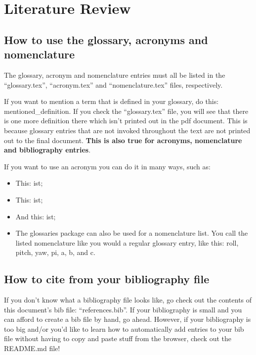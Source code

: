 \chapter{Literature Review}
\label{chapter:literature_review}

\section{How to use the glossary, acronyms and nomenclature}

The glossary, acronym and nomenclature entries must all be listed in the ``glossary.tex'', ``acronym.tex'' and ``nomenclature.tex'' files, respectively. 

If you want to mention a term that is defined in your glossary, do this: \gls{mentioned_definition}. If you check the ``glossary.tex'' file, you will see that there is one more definition there which isn't printed out in the pdf document. This is because glossary entries that are not invoked throughout the text are not printed out to the final document. \textbf{This is also true for acronyms, nomenclature and bibliography entries}.

If you want to use an acronym you can do it in many ways, such as:
\begin{itemize}
	\item This: \acrshort{ist};
	\item This: \acrlong{ist};
	\item And this: \acrfull{ist};
	\item The glossaries package can also be used for a nomenclature list. You call the listed nomenclature like you would a regular glossary entry, like this: \gls{roll}, \gls{pitch}, \gls{yaw}, \gls{pi}, \gls{a}, \gls{b}, and \gls{c}.
\end{itemize} 


\section{How to cite from your bibliography file}

If you don't know what a bibliography file looks like, go check out the contents of this document's bib file: ``references.bib''. If your bibliography is small and you can afford to create a bib file by hand, go ahead. However, if your bibliography is too big and/or you'd like to learn how to automatically add entries to your bib file without having to copy and paste stuff from the browser, check out the README.md file!

